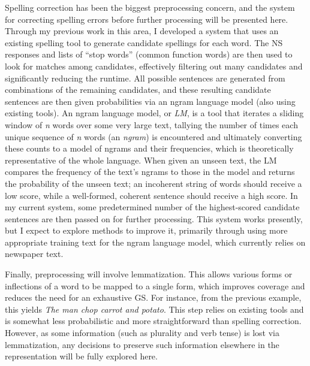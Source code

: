 \documentclass[11pt]{article}
\begin{document}
\par
Spelling correction has been the biggest preprocessing concern, and the system for correcting spelling errors before further processing will be presented here. Through my previous work in this area, I developed a system that uses an existing spelling tool to generate candidate spellings for each word. The NS responses and lists of ``stop words'' (common function words) are then used to look for matches among candidates, effectively filtering out many candidates and significantly reducing the runtime. All possible sentences are generated from combinations of the remaining candidates, and these resulting candidate sentences are then given probabilities via an ngram language model (also using existing tools). An ngram language model, or \textit{LM}, is a tool that iterates a sliding window of \textit{n} words over some very large text, tallying the number of times each unique sequence of \textit{n} words (an \textit{ngram}) is encountered and ultimately converting these counts to a model of ngrams and their frequencies, which is theoretically representative of the whole language. When given an unseen text, the LM compares the frequency of the text's ngrams to those in the model and returns the probability of the unseen text; an incoherent string of words should receive a low score, while a well-formed, coherent sentence should receive a high score. In my current system, some predetermined number of the highest-scored candidate sentences are then passed on for further processing. This system works presently, but I expect to explore methods to improve it, primarily through using more appropriate training text for the ngram language model, which currently relies on newspaper text.
\par
Finally, preprocessing will involve lemmatization. This allows various forms or inflections of a word to be mapped to a single form, which improves coverage and reduces the need for an exhaustive GS. For instance, from the previous example, this yields \textit{The man chop carrot and potato}. This step relies on existing tools and is somewhat less probabilistic and more straightforward than spelling correction. However, as some information (such as plurality and verb tense) is lost via lemmatization, any decisions to preserve such information elsewhere in the representation will be fully explored here.
\par
\end{document}
